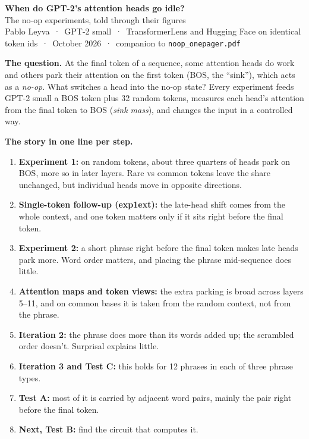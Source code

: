 \documentclass[10pt]{article}
\begin{document}
{\LARGE\bfseries When do GPT-2's attention heads go idle?}\\[2pt]
{\large\color{ink2} The no-op experiments, told through their figures}\\[2pt]
{\small\color{muted} Pablo Leyva \,·\, GPT-2 small \,·\, TransformerLens and Hugging Face on identical token ids \,·\, October 2026 \,·\, companion to \texttt{noop\_onepager.pdf}}

\vspace{6pt}
\textbf{The question.} At the final token of a sequence, some attention heads do work and others park their attention on the first token (BOS, the ``sink''), which acts as a \emph{no-op}. What switches a head into the no-op state? Every experiment feeds GPT-2 small a BOS token plus 32 random tokens, measures each head's attention from the final token to BOS (\emph{sink mass}), and changes the input in a controlled way.

\textbf{The story in one line per step.}
\begin{enumerate}[leftmargin=1.6em]
  \item \textbf{Experiment 1:} on random tokens, about three quarters of heads park on BOS, more so in later layers. Rare vs common tokens leave the share unchanged, but individual heads move in opposite directions.
  \item \textbf{Single-token follow-up (exp1ext):} the late-head shift comes from the whole context, and one token matters only if it sits right before the final token.
  \item \textbf{Experiment 2:} a short phrase right before the final token makes late heads park more. Word order matters, and placing the phrase mid-sequence does little.
  \item \textbf{Attention maps and token views:} the extra parking is broad across layers 5--11, and on common bases it is taken from the random context, not from the phrase.
  \item \textbf{Iteration 2:} the phrase does more than its words added up; the scrambled order doesn't. Surprisal explains little.
  \item \textbf{Iteration 3 and Test C:} this holds for 12 phrases in each of three phrase types.
  \item \textbf{Test A:} most of it is carried by adjacent word pairs, mainly the pair right before the final token.
  \item \textbf{Next, Test B:} find the circuit that computes it.
\end{enumerate}
\end{document}
